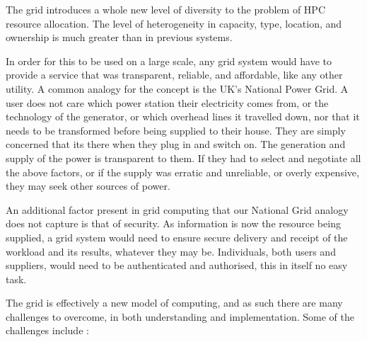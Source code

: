The grid introduces a whole new level of diversity to the problem of HPC resource
allocation.  The level of heterogeneity in capacity, type, location, and ownership is
much greater than in previous systems.

In order for this to be used on a large scale, any grid system would have to
provide a service that was transparent, reliable, and affordable, like any
other utility.  A common analogy for the concept is the UK's National Power Grid. A
user does not care which power station their electricity comes from, or the
technology of the generator, or which overhead lines it travelled down, nor
that it needs to be transformed before being supplied to their house. They are
simply concerned that its there when they plug in and switch on.  The
generation and supply of the power is transparent to them. If they had to
select and negotiate all the above factors, or if the supply was erratic and
unreliable, or overly expensive, they may seek other sources of power.

An additional factor present in grid computing that our National Grid analogy
does not capture is that of security. As information is now the resource being
supplied, a grid system would need to ensure secure delivery and receipt of the
workload and its results, whatever they may be. Individuals, both users and
suppliers, would need to be authenticated and authorised, this in itself no easy
task.

The grid is effectively a new model of computing, and as such there are many
challenges to overcome, in both understanding and implementation.  Some of the
challenges include : 

